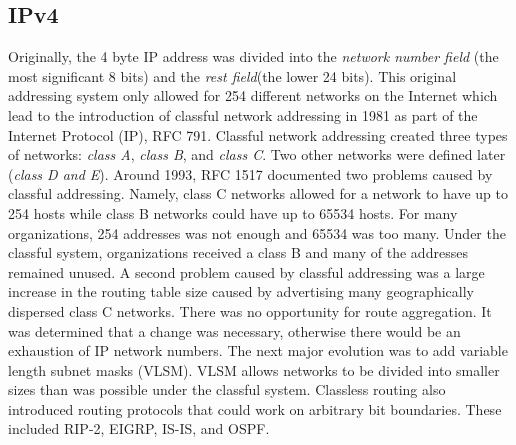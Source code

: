 \subsection{IPv4}
Originally, the 4 byte IP address was divided into the
\textit{network number field} (the most significant 8 bits) and the
\textit{rest field}(the lower 24 bits).  This original addressing
system only allowed for 254 different networks on the Internet which
lead to the introduction of classful network addressing in 1981
as part of the Internet Protocol (IP), RFC 791.  Classful network
addressing created three types of networks: \textit{class A},
\textit{class B}, and \textit{class C}.  Two other networks were
defined later (\textit{class D and E}).  Around 1993, RFC 1517
documented two problems caused by classful addressing.  Namely,
class C networks allowed for a network to have up to 254 hosts
while class B networks could have up to 65534 hosts.  For many
organizations, 254 addresses was not enough and 65534 was too many.
Under the classful system, organizations received a class B and
many of the addresses remained unused.  A second problem caused by
classful addressing was a large increase in the routing table size
caused by advertising many geographically dispersed class C networks.
There was no opportunity for route aggregation.  It was determined
that a change was necessary, otherwise there would be an exhaustion
of IP network numbers.  The next major evolution was to add variable
length subnet masks (VLSM).  VLSM allows networks to be divided
into smaller sizes than was possible under the classful system.  
Classless routing also introduced routing protocols that could work on arbitrary
bit boundaries.  These included RIP-2, EIGRP, IS-IS, and OSPF.

